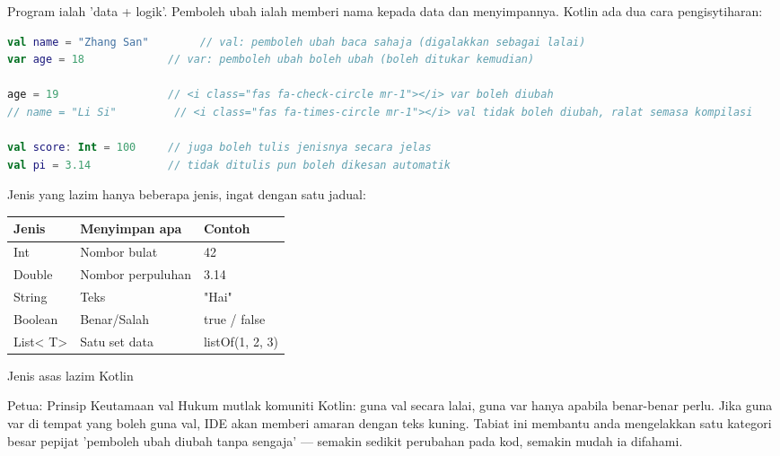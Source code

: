 


Program ialah 'data + logik'. Pemboleh ubah ialah memberi nama kepada data dan menyimpannya. Kotlin ada dua cara pengisytiharan:

\begin{lstlisting}[language=Kotlin]
val name = "Zhang San"        // val: pemboleh ubah baca sahaja (digalakkan sebagai lalai)
var age = 18             // var: pemboleh ubah boleh ubah (boleh ditukar kemudian)

age = 19                 // <i class="fas fa-check-circle mr-1"></i> var boleh diubah
// name = "Li Si"         // <i class="fas fa-times-circle mr-1"></i> val tidak boleh diubah, ralat semasa kompilasi

val score: Int = 100     // juga boleh tulis jenisnya secara jelas
val pi = 3.14            // tidak ditulis pun boleh dikesan automatik
\end{lstlisting}

Jenis yang lazim hanya beberapa jenis, ingat dengan satu jadual:

\begin{center}
\begin{tabularx}{\linewidth}{|X|X|X|}
\hline
\textbf{Jenis} & \textbf{Menyimpan apa} & \textbf{Contoh} \tabularnewline
\hline
Int & Nombor bulat & 42 \tabularnewline
Double & Nombor perpuluhan & 3.14 \tabularnewline
String & Teks & "Hai" \tabularnewline
Boolean & Benar/Salah & true / false \tabularnewline
List< T> & Satu set data & listOf(1, 2, 3) \tabularnewline
\hline
\end{tabularx}
\end{center}

\begin{center}\small\color{gray}Jenis asas lazim Kotlin\end{center}

\begin{tcbinfo}{Petua: Prinsip Keutamaan val}
Hukum mutlak komuniti Kotlin: guna val secara lalai, guna var hanya apabila benar-benar perlu. Jika guna var di tempat yang boleh guna val, IDE akan memberi amaran dengan teks kuning. Tabiat ini membantu anda mengelakkan satu kategori besar pepijat 'pemboleh ubah diubah tanpa sengaja' — semakin sedikit perubahan pada kod, semakin mudah ia difahami.

\end{tcbinfo}

